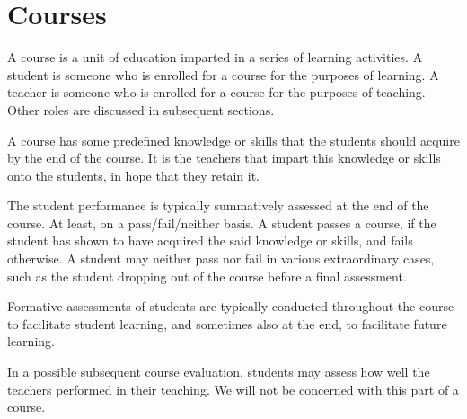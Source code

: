 
\section{Courses}

A course is a unit of education imparted in a series of learning activities. A
student is someone who is enrolled for a course for the purposes of learning.
A teacher is someone who is enrolled for a course for the purposes of teaching.
Other roles are discussed in subsequent sections.

A course has some predefined knowledge or skills that the students should
acquire by the end of the course. It is the teachers that impart this knowledge
or skills onto the students, in hope that they retain it.

The student performance is typically summatively assessed at the end of the
course. At least, on a pass/fail/neither basis. A student passes a course, if
the student has shown to have acquired the said knowledge or skills, and fails
otherwise.  A student may neither pass nor fail in various extraordinary cases,
such as the student dropping out of the course before a final assessment.

Formative assessments of students are typically conducted throughout the course
to facilitate student learning, and sometimes also at the end, to facilitate
future learning.

In a possible subsequent course evaluation, students may assess how well the
teachers performed in their teaching. We will not be concerned with this part
of a course.

